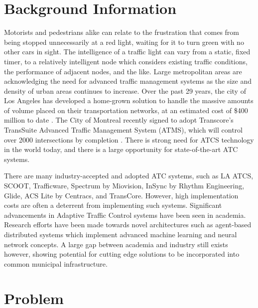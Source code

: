 \documentclass[a4paper,11pt]{article}
\begin{document}
\begin{multicols}{2}
\section{Background Information}
Motorists and pedestrians alike can relate to the frustration that comes from being stopped unnecessarily at a red light, waiting for it to turn green with no other cars in sight.
The intelligence of a traffic light can vary from a static, fixed timer, to a relatively intelligent node which considers existing traffic conditions, the performance of adjacent nodes, and the like.
Large metropolitan areas are acknowledging the need for advanced traffic management systems as the size and density of urban areas continues to increase.
Over the past 29 years, the city of Los Angeles has developed a home-grown solution to handle the massive amounts of volume placed on their transportation networks, at an estimated cost of \$400 million to date \cite{la-atcs-article}.
The City of Montreal recently signed to adopt Transcore's TransSuite Advanced Traffic Management System (ATMS), which will control over 2000 intersections by completion \cite{montreal-transcore}.
There is strong need for ATCS technology in the world today, and there is a large opportunity for state-of-the-art ATC systems.

There are many industry-accepted and adopted ATC systems, such as LA ATCS, SCOOT, Trafficware, Spectrum by Miovision, InSync by Rhythm Engineering, Glide, ACS Lite by Centracs, and TransCore.
However, high implementation costs are often a deterrent from implementing such systems.
Significant advancements in Adaptive Traffic Control systems have been seen in academia.
Research efforts have been made towards novel architectures such as agent-based distributed systems which implement advanced machine learning and neural network concepts\cite{1688100, 5073360, uot-article}.
A large gap between academia and industry still exists however, showing potential for cutting edge solutions to be incorporated into common municipal infrastructure.

\section{Problem}


\end{multicols}
\end{document}

